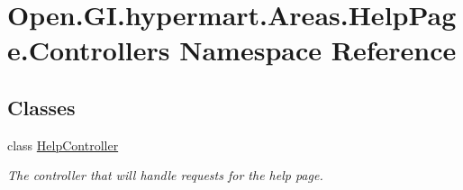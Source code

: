 \hypertarget{namespace_open_1_1_g_i_1_1hypermart_1_1_areas_1_1_help_page_1_1_controllers}{}\section{Open.\+G\+I.\+hypermart.\+Areas.\+Help\+Page.\+Controllers Namespace Reference}
\label{namespace_open_1_1_g_i_1_1hypermart_1_1_areas_1_1_help_page_1_1_controllers}
\subsection*{Classes}
\begin{DoxyCompactItemize}
\item 
class \hyperlink{class_open_1_1_g_i_1_1hypermart_1_1_areas_1_1_help_page_1_1_controllers_1_1_help_controller}{Help\+Controller}
\begin{DoxyCompactList}\small\item\em The controller that will handle requests for the help page. \end{DoxyCompactList}\end{DoxyCompactItemize}
